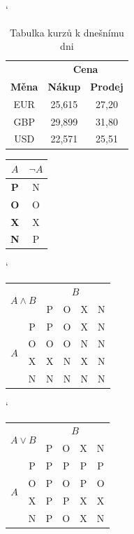 \documentclass[a4paper, 11pt]{article}
\begin{document}
\begin{table} [h!]
\centering
\catcode`

\begin{tabular}{|c|c|c|}  \hline
 & \multicolumn{2}{c|}{\textbf{Cena}}\\ \cline{2-3}
\textbf{Měna} & \textbf{Nákup} & \textbf{Prodej} \\ \hline
 EUR & 25,615 & 27,20 \\ 
 GBP & 29,899 & 31,80 \\ 
 USD & 22,571 & 25,51 \\ \hline
\end{tabular}
\caption{Tabulka kurzů k dnešnímu dni}
\end{table}



\begin{table}[h]
\centering

\begin{minipage}{.10\linewidth}
\hspace{2cm}
\centering
\begin{tabular}{|c|c|} \hline
$A$ & $\neg A $ \\ \hline
\textbf{P} & N   \\ \hline
\textbf{O} & O \\ \hline
\textbf{X} & X  \\ \hline
\textbf{N} & P \\\hline
\end{tabular}
\end{minipage}
\begin{minipage}{.20\linewidth}
\centering
\catcode`
\begin{tabular}{|c|c|c|c|c|c|}\hline
\multicolumn{2}{|c|}{\multirow{2}{*}{$A \wedge B$}} & \multicolumn{4}{|c|}{$B$} \\ \cline{3-6}
\multicolumn{1}{|c}{}&  & P & O & X & N \\ \hline
& P & P & O & X & N \\ \cline{2-6}
\multirow{2}{*}{$A$} & O & O & O & N & N \\ \cline{2-6}
& X & X & N & X & N \\ \cline{2-6}
& N & N & N & N & N \\ \hline

\end{tabular}
\end{minipage}
\hspace{1cm}
\begin{minipage}{.20\linewidth}
\centering
\catcode`
\begin{tabular}{|c|c|c|c|c|c|}\hline
\multicolumn{2}{|c|}{\multirow{2}{*}{$A \vee B$}} & \multicolumn{4}{|c|}{$B$} \\ \cline{3-6}
\multicolumn{1}{|c}{}&  & P & O & X & N \\ \hline
& P & P & P & P & P \\ \cline{2-6}
\multirow{2}{*}{$A$} & O & P & O & P & O \\ \cline{2-6}
& X & P & P & X & X \\ \cline{2-6}
& N & P & O & X & N \\ \hline


\end{tabular}
\end{minipage}
\end{table}
\end{document}
